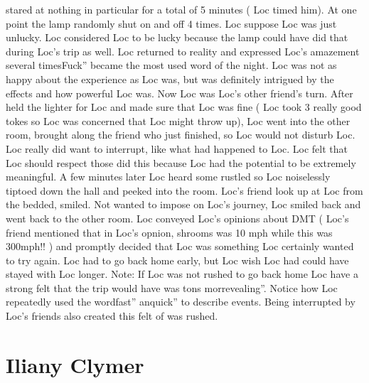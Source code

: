 \documentclass[12pt]{book}
\begin{document}
stared at nothing in particular for a total of 5 minutes ( Loc timed him). At one point the lamp randomly shut on and off 4 times. Loc suppose Loc was just unlucky. Loc considered Loc to be lucky because the lamp could have did that during Loc's trip as well. Loc returned to reality and expressed Loc's amazement several timesFuck'' became the most used word of the night. Loc was not as happy about the experience as Loc was, but was definitely intrigued by the effects and how powerful Loc was. Now Loc was Loc's other friend's turn. After held the lighter for Loc and made sure that Loc was fine ( Loc took 3 really good tokes so Loc was concerned that Loc might throw up), Loc went into the other room, brought along the friend who just finished, so Loc would not disturb Loc. Loc really did want to interrupt, like what had happened to Loc. Loc felt that Loc should respect those did this because Loc had the potential to be extremely meaningful. A few minutes later Loc heard some rustled so Loc noiselessly tiptoed down the hall and peeked into the room. Loc's friend look up at Loc from the bedded, smiled. Not wanted to impose on Loc's journey, Loc smiled back and went back to the other room. Loc conveyed Loc's opinions about DMT ( Loc's friend mentioned that in Loc's opnion, shrooms was 10 mph while this was 300mph!! ) and promptly decided that Loc was something Loc certainly wanted to try again. Loc had to go back home early, but Loc wish Loc had could have stayed with Loc longer. Note: If Loc was not rushed to go back home Loc have a strong felt that the trip would have was tons morrevealing''. Notice how Loc repeatedly used the wordfast'' anquick'' to describe events. Being interrupted by Loc's friends also created this felt of was rushed.






\chapter{Iliany Clymer}
\end{document}
